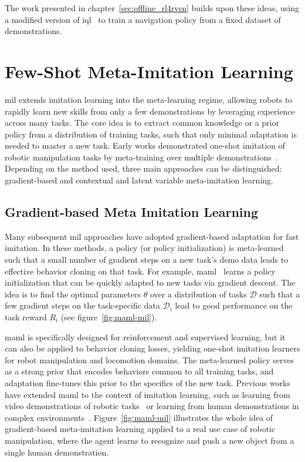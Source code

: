 The work presented in chapter~\ref{sec:offline_rl4rvsn} builds upon these ideas, using a modified version of \acrshort{iql}~\cite{kostrikov2022offline} to train a navigation policy from a fixed dataset of demonstrations.

\section{Few-Shot Meta-Imitation Learning}\label{sec:meta-imitation-learning}

\acrfull{mil} extends imitation learning into the meta-learning regime, allowing robots to rapidly learn new skills from only a few demonstrations by leveraging experience across many tasks.
The core idea is to extract common knowledge or a prior policy from a distribution of training tasks, such that only minimal adaptation is needed to master a new task.
Early works demonstrated one-shot imitation of robotic manipulation tasks by meta-training over multiple demonstrations~\cite{Duan2017OneShotIL, finnOneShotVisualImitation2017}.
Depending on the method used, three main approaches can be distinguished: gradient-based and contextual and latent variable meta-imitation learning.

\subsection{Gradient-based Meta Imitation Learning}\label{subsec:gradient-based-meta-imitation-learning}

Many subsequent \acrshort{mil} approaches have adopted gradient-based adaptation for fast imitation.
In these methods, a policy (or policy initialization) is meta-learned such that a small number of gradient steps on a new task’s demo data leads to effective behavior cloning on that task.
For example, \acrfull{maml}~\cite{finn2017} learns a policy initialization that can be quickly adapted to new tasks via gradient descent.
The idea is to find the optimal parameters $\theta$ over a distribution of tasks $\mathcal{D}$ such that a few gradient steps on the task-specific data $\mathcal{D}_i$ lead to good performance on the task reward $R_i$ (see figure~\ref{fig:maml-mil}).

\acrshort{maml} is specifically designed for reinforcement and supervised learning, but it can also be applied to behavior cloning losses, yielding one-shot imitation learners for robot manipulation and locomotion domains.
The meta-learned policy serves as a strong prior that encodes behaviors common to all training tasks, and adaptation fine-tunes this prior to the specifics of the new task.
Previous works have extended \acrshort{maml} to the context of imitation learning, such as learning from video demonstrations of robotic tasks~\cite{finnOneShotVisualImitation2017} or learning from human demonstrations in complex environments~\cite{Yu2018OneShotIF}.
Figure~\ref{fig:maml-mil} illustrates the whole idea of gradient-based meta-imitation learning applied to a real use case of robotic manipulation, where the agent learns to recognize and push a new object from a single human demonstration.

